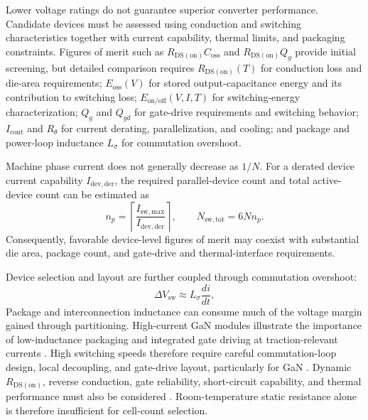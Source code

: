 Lower voltage ratings do not guarantee superior converter performance.
Candidate devices must be assessed using conduction and switching
characteristics together with current capability, thermal limits, and
packaging constraints. Figures of merit such as
$R_{\mathrm{DS(on)}}C_{\mathrm{oss}}$ and $R_{\mathrm{DS(on)}}Q_g$
provide initial screening, but detailed comparison requires
$R_{\mathrm{DS(on)}}(T)$ for conduction loss and die-area requirements;
$E_{\mathrm{oss}}(V)$ for stored output-capacitance energy and its
contribution to switching loss; $E_{\mathrm{on/off}}(V,I,T)$ for
switching-energy characterization; $Q_g$ and $Q_{gd}$ for gate-drive
requirements and switching behavior; $I_{\mathrm{cont}}$ and $R_\theta$
for current derating, parallelization, and cooling; and package and
power-loop inductance $L_\sigma$ for commutation overshoot.

Machine phase current does not generally decrease as $1/N$. For a
derated device current capability $I_{\mathrm{dev,der}}$, the required
parallel-device count and total active-device count can be estimated as
\begin{equation}
n_p
=
\left\lceil
\frac{I_{\mathrm{sw,max}}}
     {I_{\mathrm{dev,der}}}
\right\rceil,
\qquad
N_{\mathrm{sw,tot}}
=
6Nn_p.
\label{eq:parallel_device_scaling}
\end{equation}
Consequently, favorable device-level figures of merit may coexist with
substantial die area, package count, and gate-drive and thermal-interface
requirements.

Device selection and layout are further coupled through commutation
overshoot:
\begin{equation}
\Delta V_{\mathrm{sw}}
\approx
L_{\sigma}\frac{di}{dt},
\label{eq:semiconductor_overshoot}
\end{equation}
Package and interconnection inductance can consume much of the voltage
margin gained through partitioning.
High-current GaN modules illustrate the importance of low-inductance packaging and integrated gate driving at traction-relevant currents \cite{Zhu2024GaN150A,Rahman2025GaN300A}. High switching speeds therefore
require careful commutation-loop design, local decoupling, and
gate-drive layout, particularly for GaN \cite{Rahman2025GaN300A}.
Dynamic $R_{\mathrm{DS(on)}}$, reverse conduction, gate reliability,
short-circuit capability, and thermal performance must also be
considered \cite{Ajayan2025GaNReliability,Ajayan2025GaNFabrication}.
Room-temperature static resistance alone is therefore insufficient for
cell-count selection.

